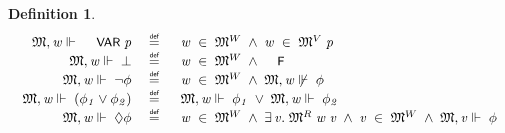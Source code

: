 \documentclass{llncs}
\newtheorem{defn}{Definition}[chapter]
\newenvironment{holmath}{\begin{displaymath}\begin{array}{l}}{\end{array}\end{displaymath}\ignorespacesafterend}
\renewcommand{\HOLConst}[1]{{\textsf{\upshape\small #1}}}
\begin{document}
\begin{defn}
{\upshape\cite[Definition 1.20]{Blackburn}}
\begin{holmath}
\begin{array}{rcl}
  \HOLFreeVar{\ensuremath{\mathfrak{M}}},\HOLFreeVar{w}\ensuremath{\Vdash}\;\HOLConst{VAR}\;\HOLFreeVar{p}\;&\HOLTokenDefEquality{}&\;\HOLFreeVar{w}\;\HOLSymConst{\HOLTokenIn{}}\;\HOLFreeVar{\ensuremath{\mathfrak{M}}}\HOLSymConst{\ensuremath{\sp{W}}}\;\HOLSymConst{\HOLTokenConj{}}\;\HOLFreeVar{w}\;\HOLSymConst{\HOLTokenIn{}}\;\HOLFreeVar{\ensuremath{\mathfrak{M}}}\HOLSymConst{\ensuremath{\sp{V}}}\;\HOLFreeVar{p}\\
\HOLFreeVar{\ensuremath{\mathfrak{M}}},\HOLFreeVar{w}\ensuremath{\Vdash}\;\HOLSymConst{\ensuremath{\bot}}\;&\HOLTokenDefEquality{}&\;\HOLFreeVar{w}\;\HOLSymConst{\HOLTokenIn{}}\;\HOLFreeVar{\ensuremath{\mathfrak{M}}}\HOLSymConst{\ensuremath{\sp{W}}}\;\HOLSymConst{\HOLTokenConj{}}\;\HOLConst{F}\\
\HOLFreeVar{\ensuremath{\mathfrak{M}}},\HOLFreeVar{w}\ensuremath{\Vdash}\;\HOLSymConst{\HOLTokenNeg{}}\HOLFreeVar{\ensuremath{\phi}}\;&\HOLTokenDefEquality{}&\;\HOLFreeVar{w}\;\HOLSymConst{\HOLTokenIn{}}\;\HOLFreeVar{\ensuremath{\mathfrak{M}}}\HOLSymConst{\ensuremath{\sp{W}}}\;\HOLSymConst{\HOLTokenConj{}}\;\HOLFreeVar{\ensuremath{\mathfrak{M}}},\HOLFreeVar{w}\ensuremath{\not\Vdash}\;\HOLFreeVar{\ensuremath{\phi}}\\
\HOLFreeVar{\ensuremath{\mathfrak{M}}},\HOLFreeVar{w}\ensuremath{\Vdash}\;(\HOLFreeVar{\ensuremath{\phi\sb{1}}}\HOLSymConst{\ensuremath{\lor}}\HOLFreeVar{\ensuremath{\phi\sb{2}}})\;&\HOLTokenDefEquality{}&\;\HOLFreeVar{\ensuremath{\mathfrak{M}}},\HOLFreeVar{w}\ensuremath{\Vdash}\;\HOLFreeVar{\ensuremath{\phi\sb{1}}}\;\HOLSymConst{\HOLTokenDisj{}}\;\HOLFreeVar{\ensuremath{\mathfrak{M}}},\HOLFreeVar{w}\ensuremath{\Vdash}\;\HOLFreeVar{\ensuremath{\phi\sb{2}}}\\
\HOLFreeVar{\ensuremath{\mathfrak{M}}},\HOLFreeVar{w}\ensuremath{\Vdash}\;\HOLSymConst{\ensuremath{\Diamond}}\HOLFreeVar{\ensuremath{\phi}}\;&\HOLTokenDefEquality{}&\;\HOLFreeVar{w}\;\HOLSymConst{\HOLTokenIn{}}\;\HOLFreeVar{\ensuremath{\mathfrak{M}}}\HOLSymConst{\ensuremath{\sp{W}}}\;\HOLSymConst{\HOLTokenConj{}}\;\HOLSymConst{\HOLTokenExists{}}\HOLBoundVar{v}.\;\HOLFreeVar{\ensuremath{\mathfrak{M}}}\HOLSymConst{\ensuremath{\sp{R}}}\;\HOLFreeVar{w}\;\HOLBoundVar{v}\;\HOLSymConst{\HOLTokenConj{}}\;\HOLBoundVar{v}\;\HOLSymConst{\HOLTokenIn{}}\;\HOLFreeVar{\ensuremath{\mathfrak{M}}}\HOLSymConst{\ensuremath{\sp{W}}}\;\HOLSymConst{\HOLTokenConj{}}\;\HOLFreeVar{\ensuremath{\mathfrak{M}}},\HOLBoundVar{v}\ensuremath{\Vdash}\;\HOLFreeVar{\ensuremath{\phi}}
\end{array}
\end{holmath}
\end{defn}
\end{document}
